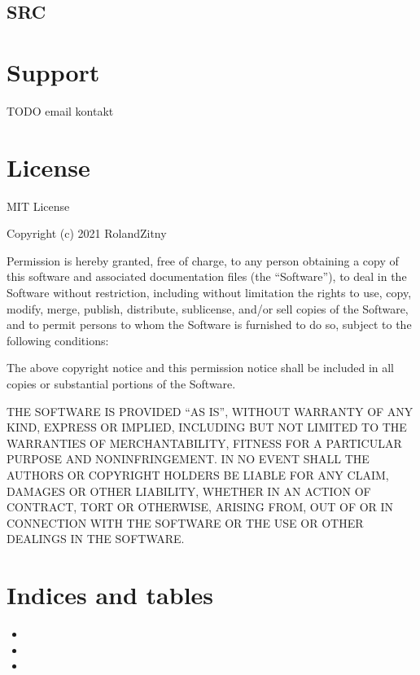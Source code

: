 \documentclass[letterpaper,10pt,english]{sphinxmanual}
\begin{document}
\section{SRC}
\label{\detokenize{modules:src}}

\chapter{Support}
\label{\detokenize{support:support}}\label{\detokenize{support::doc}}
\sphinxAtStartPar
TODO email kontakt


\chapter{License}
\label{\detokenize{license:license}}\label{\detokenize{license::doc}}
\sphinxAtStartPar
MIT License

\sphinxAtStartPar
Copyright (c) 2021 RolandZitny

\sphinxAtStartPar
Permission is hereby granted, free of charge, to any person obtaining a copy
of this software and associated documentation files (the “Software”), to deal
in the Software without restriction, including without limitation the rights
to use, copy, modify, merge, publish, distribute, sublicense, and/or sell
copies of the Software, and to permit persons to whom the Software is
furnished to do so, subject to the following conditions:

\sphinxAtStartPar
The above copyright notice and this permission notice shall be included in all
copies or substantial portions of the Software.

\sphinxAtStartPar
THE SOFTWARE IS PROVIDED “AS IS”, WITHOUT WARRANTY OF ANY KIND, EXPRESS OR
IMPLIED, INCLUDING BUT NOT LIMITED TO THE WARRANTIES OF MERCHANTABILITY,
FITNESS FOR A PARTICULAR PURPOSE AND NONINFRINGEMENT. IN NO EVENT SHALL THE
AUTHORS OR COPYRIGHT HOLDERS BE LIABLE FOR ANY CLAIM, DAMAGES OR OTHER
LIABILITY, WHETHER IN AN ACTION OF CONTRACT, TORT OR OTHERWISE, ARISING FROM,
OUT OF OR IN CONNECTION WITH THE SOFTWARE OR THE USE OR OTHER DEALINGS IN THE
SOFTWARE.


\chapter{Indices and tables}
\label{\detokenize{index:indices-and-tables}}\begin{itemize}
\item {} 
\sphinxAtStartPar
{}

\item {} 
\sphinxAtStartPar
{}

\item {} 
\sphinxAtStartPar
{}

\end{itemize}


\renewcommand{\indexname}{Python Module Index}
\begin{sphinxtheindex}
\let\bigletter\sphinxstyleindexlettergroup
\bigletter{s}
\item\relax{}
\end{sphinxtheindex}

\renewcommand{\indexname}{Index}
\printindex
\end{document}
